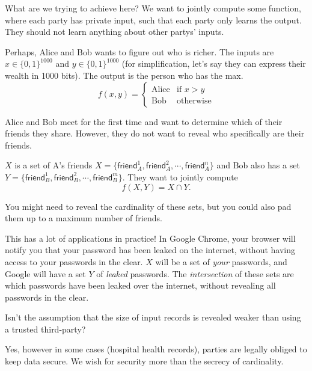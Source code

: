 What are we trying to achieve here? We want to jointly compute some function, where each party has private input, such that each party only learns the output. They should not learn anything about other partys' inputs.

\begin{example*}
    Perhaps, Alice and Bob wants to figure out who is richer. The inputs are $x\in\{0, 1\}^{1000}$ and $y\in\{0, 1\}^{1000}$ (for simplification, let's say they can express their wealth in 1000 bits). The output is the person who has the max.
    \[f(x, y) = \begin{cases}
            \text{Alice} & \text{if }x > y  \\
            \text{Bob}   & \text{otherwise}
        \end{cases}\]
\end{example*}

\begin{example*}\label{ex:psi}
    Alice and Bob meet for the first time and want to determine which of their friends they share. However, they do not want to reveal who specifically are their friends.

    $X$ is a set of A's friends $X = \{\mathsf{friend}_A^1, \mathsf{friend}_A^2, \cdots, \mathsf{friend}_A^n\}$ and Bob also has a set $Y = \{\mathsf{friend}_B^1, \mathsf{friend}_B^2, \cdots, \mathsf{friend}_B^m\}$. They want to jointly compute \[f(X, Y) = X\cap Y.\]

    You might need to reveal the cardinality of these sets, but you could also pad them up to a maximum number of friends.

    This has a lot of applications in practice! In Google Chrome, your browser will notify you that your password has been leaked on the internet, without having access to your passwords in the clear. $X$ will be a set of \emph{your} passwords, and Google will have a set $Y$ of \emph{leaked} passwords. The \emph{intersection} of these sets are which passwords have been leaked over the internet, without revealing all passwords in the clear.
\end{example*}
\begin{ques*}
    Isn't the assumption that the size of input records is revealed weaker than using a trusted third-party?

    Yes, however in some cases (hospital health records), parties are legally obliged to keep data secure. We wish for security more than the secrecy of cardinality.
\end{ques*}

